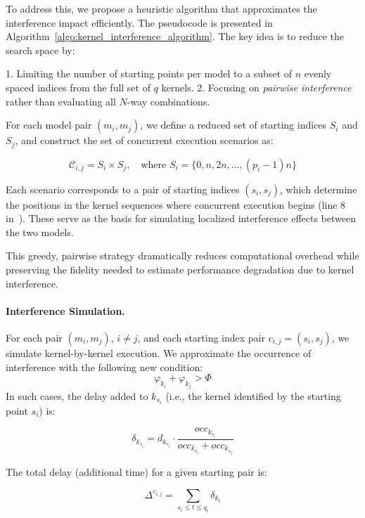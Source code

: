 To address this, we propose a heuristic algorithm that approximates the interference impact efficiently. The pseudocode is presented in Algorithm~\cref{algo:kernel_interference_algorithm}. The key idea is to reduce the search space by:

1. Limiting the number of starting points per model to a subset of $n$ evenly spaced indices from the full set of $q$ kernels.
2. Focusing on \textit{pairwise interference} rather than evaluating all $N$-way combinations.

For each model pair $(m_i, m_j)$, we define a reduced set of starting indices $S_i$ and $S_j$, and construct the set of concurrent execution scenarios as:

\begin{equation*}
	\mathcal{C}_{i,j} = S_i \times S_j, \quad \text{where } S_i = \{0, n, 2n, \dots, (p_i - 1)n\}
\end{equation*}

Each scenario corresponds to a pair of starting indices $(s_i, s_j)$, which determine the positions in the kernel sequences where concurrent execution begins (line 8 in~). These serve as the basis for simulating localized interference effects between the two models.

This greedy, pairwise strategy dramatically reduces computational overhead while preserving the fidelity needed to estimate performance degradation due to kernel interference.

\paragraph{Interference Simulation.} For each pair $(m_i, m_j)$, $i \neq j$, and each starting index pair $c_{i,j}=(s_i, s_j)$, we simulate kernel-by-kernel execution. We approximate the occurrence of interference with the following new condition:
\begin{equation}
	\varphi_{k_i} + \varphi_{k_j} > \Phi
\end{equation}
In such cases, the delay added to $k_{s_i}$ (i.e., the kernel identified by the starting point $s_i$) is:

$$
	\delta_{k_{s_i}} = d_{k_{s_i}} \cdot \frac{occ_{k_{s_i}}}{occ_{k_{s_i}} + occ_{k_{s_j}}}
$$

The total delay (additional time) for a given starting pair is:

$$
	\Delta^{c_{i,j}} = \sum_{ s_i \leq t \leq q_i} \delta_{k_t}
$$

